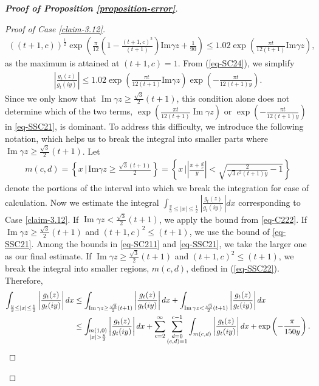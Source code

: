 \documentclass[11pt]{amsart}
\theoremstyle{plain}
\renewcommand{\Im}{\operatorname{Im}}
\numberwithin{equation}{section}
\begin{document}
\begin{proof}[\textbf{\boldmath Proof of Proposition \ref{proposition-error}}]
\begin{proof}[Proof of Case \ref{claim-3.12}]
\begin{align*}
				((t+1,c))^{\frac{1}{2}}\exp\left(\frac{\pi}{12}\left(1-\frac{(t+1,c)^{2}}{(t+1)}\right)\text{Im}\gamma z+\frac{1}{90}\right)\le 1.02\exp\left(\frac{\pi t}{12(t+1)}\text{Im}\gamma z\right),   
			\end{align*}
			as the maximum is attained at $(t+1,c)=1$. From (\ref{eq-SC24}), we simplify
			\begin{align}\label{eq-SSC21}
				\left|\frac{g_{t}(z)}{g_t(iy)}\right|\le 1.02 \exp\left(\frac{\pi t}{12(t+1)}\text{Im}\gamma z\right)\exp\left(-\frac{\pi t}{12(t+1)y}\right).  
			\end{align}
			Since we only know that $\Im \gamma z \ge \frac{\sqrt{3}}{2}(t+1)$, this condition alone does not determine which of the two terms, 
			$\exp\left(\frac{\pi t}{12(t+1)} \Im \gamma z\right)$ or 
			$\exp\left(-\frac{\pi t}{12(t+1)y}\right)$ in \eqref{eq-SSC21}, is dominant. To address this difficulty, we introduce the following notation, which helps us to break the integral into smaller parts where $\Im\gamma z \ge \frac{\sqrt{3}}{2}(t+1)$. Let 
			\begin{align}\label{eq-SSC22}
				m(c,d)=\left\{x\,|\,\text{Im}\gamma z\ge\frac{\sqrt{3}(t+1)}{2}\right\}=\left\{x\,|\left|\frac{x+\frac{d}{c}}{y}\right|<\sqrt{\frac{2}{\sqrt{3}c^{2}(t+1)y}-1}\right\}
			\end{align}
			denote the portions of the interval into which we break the integration for ease of calculation.
			\newline
			Now we estimate the integral $\int_{\frac{y}{3}\le|x|\le \frac{1}{2}}\left|\frac{g_t(z)}{g_t(iy)}\right|dx$ corresponding to Case \ref{claim-3.12}. If $\Im\gamma z< \frac{\sqrt{3}}{2}(t+1)$, we apply the bound from \eqref{eq-C222}. If $\Im\gamma z\ge \frac{\sqrt{3}}{2}(t+1)$ and $(t+1,c)^{2} \le (t+1)$, we use the bound of \eqref{eq-SSC21}. Among the bounds in \eqref{eq-SC211} and \eqref{eq-SSC21}, we take the larger one as our final estimate. If $\Im\gamma z\ge \frac{\sqrt{3}}{2}(t+1)$ and $(t+1,c)^{2} \le (t+1)$, we break the integral into smaller regions, $m(c,d)$, defined in (\ref{eq-SSC22}). Therefore,
			\begin{align}\label{eq-SSC23}
				\notag
				\int_{\frac{y}{3}\le|x|\le \frac{1}{2}}\left|\frac{g_{t}(z)}{g_t(iy)}\right|dx&\le \int_{\Im \gamma z\ge \frac{\sqrt{3}}{2}(t+1)}\left|\frac{g_{t}(z)}{g_t(iy)}\right|dx+\int_{\Im \gamma z< \frac{\sqrt{3}}{2}(t+1)}\left|\frac{g_{t}(z)}{g_t(iy)}\right|dx\\
				&\le \int_{\substack{m(1,0)\\|x|>\frac{y}{3}}}\left|\frac{g_{t}(z)}{g_t(iy)}\right|dx+\sum_{c=2}^{\infty}\sum_{\substack{d=0\\(c,d)=1}}^{c-1}\int_{m(c,d)}\left|\frac{g_{t}(z)}{g_t(iy)}\right|dx+\exp\left(-\frac{\pi}{150y}\right).

\end{align}
\end{proof}
\end{proof}
\end{document}
